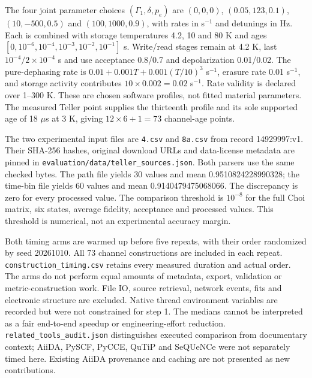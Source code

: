 \documentclass[10pt,a4paper]{article}
\newcommand{\code}[1]{\texttt{#1}}
\begin{document}
The four joint parameter choices $(\Gamma_1,\delta,p_e)$ are $(0,0,0)$, $(0.05,123,0.1)$, $(10,-500,0.5)$ and $(100,1000,0.9)$, with rates in s$^{-1}$ and detunings in Hz. Each is combined with storage temperatures 4.2, 10 and 80 K and ages $[0,10^{-6},10^{-4},10^{-3},10^{-2},10^{-1}]$ s. Write/read stages remain at 4.2 K, last $10^{-4}/2\times10^{-4}$ s and use acceptance 0.8/0.7 and depolarization 0.01/0.02. The pure-dephasing rate is $0.01+0.001T+0.001(T/10)^3$ s$^{-1}$, erasure rate 0.01 s$^{-1}$, and storage activity contributes $10\times0.002=0.02$ s$^{-1}$. Rate validity is declared over 1--300 K. These are chosen software profiles, not fitted material parameters. The measured Teller point supplies the thirteenth profile and its sole supported age of 18 $\mu$s at 3 K, giving $12\times6+1=73$ channel-age points.

The two experimental input files are \code{4.csv} and \code{8a.csv} from record 14929997:v1. Their SHA-256 hashes, original download URLs and data-license metadata are pinned in \code{evaluation/data/teller\_sources.json}. Both parsers use the same checked bytes. The path file yields 30 values and mean 0.9510824228990328; the time-bin file yields 60 values and mean 0.9140479475068066. The discrepancy is zero for every processed value. The comparison threshold is $10^{-8}$ for the full Choi matrix, six states, average fidelity, acceptance and processed values. This threshold is numerical, not an experimental accuracy margin.

Both timing arms are warmed up before five repeats, with their order randomized by seed 20261010. All 73 channel constructions are included in each repeat. \code{construction\_timing.csv} retains every measured duration and actual order. The arms do not perform equal amounts of metadata, export, validation or metric-construction work. File IO, source retrieval, network events, fits and electronic structure are excluded. Native thread environment variables are recorded but were not constrained for step 1. The medians cannot be interpreted as a fair end-to-end speedup or engineering-effort reduction. \code{related\_tools\_audit.json} distinguishes executed comparison from documentary context; AiiDA, PySCF, PyCCE, QuTiP and SeQUeNCe were not separately timed here. Existing AiiDA provenance and caching are not presented as new contributions.
\end{document}
